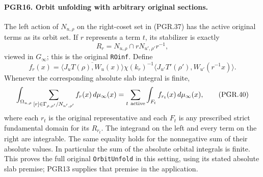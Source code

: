 \documentclass[11pt,a4paper]{article}
\numberwithin{equation}{section}
\theoremstyle{remark}\newtheorem{remark}[theorem]{Remark}
\begin{document}
\paragraph{PGR16. Orbit unfolding with arbitrary original sections.}
\label{claim:PGR16}
The left action of \(N_{u,\rho}\) on the right-coset set in
(PGR.37) has the active original terms as its orbit set.  If \(r\)
represents a term \(t\), its stabilizer is exactly
\[
 R_r=N_{u,\rho}\cap rN_{u',\rho'}r^{-1},
\tag{PGR.38}
\]
viewed in \(G_\infty\); this is the original
\texttt{ROinf}.  Define
\[
 f_r(x)=\overline{\langle J_uT(\rho),W_u(x)\rangle}
       \chi(k_r)^{-1}
       \langle J_{u'}T'(\rho'),W_{u'}(r^{-1}x)\rangle.
\tag{PGR.39}
\]
Whenever the corresponding absolute slab integral is finite,
\[
 \int_{\Omega_{u,\rho}}
       \sum_{[r]\in\Gamma_{\rho,\rho'}/N_{u',\rho'}}
                 f_r(x)\,d\mu_\infty(x)
   =\sum_{t\ {\rm active}}\int_{F_t} f_{r_t}(x)\,d\mu_\infty(x),
\tag{PGR.40}
\]
where each \(r_t\) is the original representative and each
\(F_t\) is any prescribed strict fundamental domain for its
\(R_{r_t}\).  The integrand on the left and every term on the
right are integrable.  The same equality holds for the nonnegative
sum of their absolute values.  In particular the sum of the absolute
orbital integrals is finite.  This proves the full original
\texttt{Orbit\allowbreak Unfold} in this setting, using its stated absolute
slab premise; PGR13 supplies that premise in the application.
\end{document}
